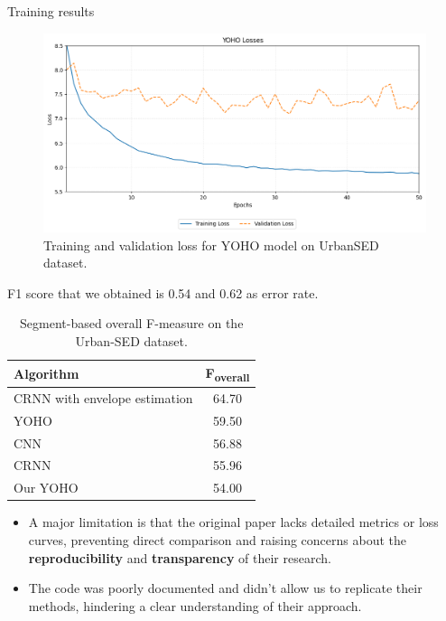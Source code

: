 	\begin{frame}[allowframebreaks]{Training results}
		\begin{figure}
			\centering
			\includegraphics[width=.7\textwidth]{images/losses.png}

			\caption{Training and validation loss for YOHO model on UrbanSED dataset.}
			\label{fig:trainingLosses}
		\end{figure}
		
		\framebreak
		
		F1 score that we obtained is \SI{0.54}{} and \SI{0.62}{} as error rate.
		
		\begin{table}[h!]
    \centering
    \begin{tabular}{||l|c||}
        \hline
        \textbf{Algorithm} & \textbf{F\textsubscript{overall}} \\
        \hline
        CRNN with envelope estimation & 64.70 \\
        YOHO & 59.50 \\
        CNN & 56.88 \\
        CRNN & 55.96 \\
        \rowcolor{lightgray} 
        Our YOHO & 54.00 \\
        \hline
    \end{tabular}
    \caption{Segment-based overall F-measure on the Urban-SED dataset.}
    \label{tab:performance}
\end{table}
		
		\pagebreak
		
		\begin{itemize}
		\item A major limitation is that the original paper lacks detailed metrics or loss curves, preventing direct comparison and raising concerns about the \textbf{reproducibility} and \textbf{transparency} of their research.
		
		\item The code was poorly documented and didn’t allow us to replicate their methods, hindering a clear understanding of their approach.
		
		\end{itemize}
		
	\end{frame}
	
	
